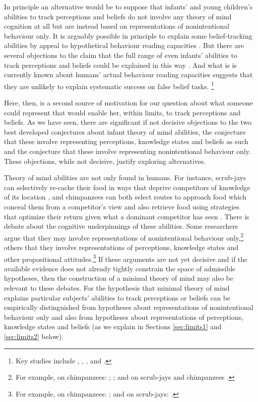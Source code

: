 \documentclass[12pt,\papersize]{extarticle}
\begin{document}
In principle an alternative would be to suppose that infants' and young children's abilities to track perceptions and beliefs 
do not involve any theory of mind cognition at all
but are instead based on 
representations of nonintentional behaviour only.
It is arguably possible in principle to explain some belief-tracking abilities by appeal to hypothetical behaviour reading capacities  \citep{perner:1988_developing,en_1168, en_1169}.
But there are several objections to the claim that the full range of even infants' abilities to track perceptions and beliefs could be explained in this way \citep{en_1691,Apperly:2009ju}.  
And what is is currently known about humans' actual behaviour reading capacities suggests that they are unlikely to explain systematic success on false belief tasks.%
\footnote{
Key studies include
	\citet{Newtson:1976ni}, 
	\citet{Byrne:1999jk},
	\citet{Baldwin:2001rs},
	\citet{Saylor:2007pj} and
	\citet{Baldwin:2008mw}.
} 
 
Here, then, is a second source of motivation for our question about what someone could represent that would enable her, within limits, to track perceptions and beliefs.
As we have seen, there are significant if not decisive objections to the two best developed conjectures about infant theory of mind abilities, the conjecture that these involve representing perceptions, knowledge states and beliefs as such and the conjecture that these involve representing nonintentional behaviour only.  
These objections, while not decisive, justify exploring alternatives.

Theory of mind abilities are not only found in humans.
For instance,
scrub-jays can selectively re-cache their food in ways that deprive competitors of knowledge of its location \citep{Clayton:2007fh}, and  chimpanzees can both select routes to approach food which conceal them from a competitor’s view \citep[]{en_1546} and also retrieve food using strategies that optimize their return given what a dominant competitor has seen \citep[]{en_1545}.  
There is debate about the cognitive underpinnings of these abilities. 
Some researchers argue that they may involve representations of nonintentional behaviour only,\footnote{
For example, on chimpanzees: 
	\citet{povinelli:2004vonk}; 
	\citet[pp.\ 364-5]{Vonk:2006cq}; and on scrub-jays and chimpanzees \citet{Penn:2007ey}.
} 
others that they involve representations of perceptions, knowledge states and other propositional attitudes.\footnote{
For example, on chimpanzees: \citet{Tomasello:2005ce,
			Call:2008di}; and on scrub-jays: 
			\citet[p.\ 73]{Emery:2007ze}.
}
If these arguments are not yet decisive
and if the available evidence does not already tightly constrain the space of admissible hypotheses,
then the construction of a minimal theory of mind may also be relevant to these debates.
For the hypothesis that minimal theory of mind explains particular subjects' abilities to track perceptions or beliefs can be empirically distinguished from hypotheses about representations of nonintentional behaviour only and also from hypotheses about representations of perceptions, knowledge states and beliefs (as we explain in Sections \ref{sec:limits1} and \ref{sec:limits2} below).
\end{document}
